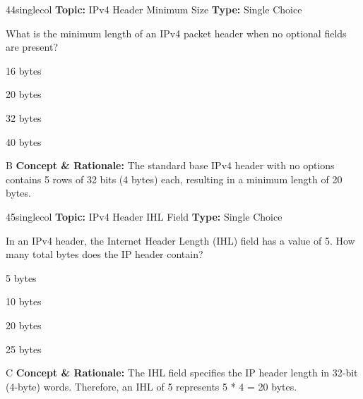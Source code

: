 \begin{qcard}{44}{singlecol}
\textcolor{darkslate!75}{\small\textbf{Topic:} IPv4 Header Minimum Size \hfill \textbf{Type:} Single Choice}\vspace{0.4em}\par
What is the minimum length of an IPv4 packet header when no optional fields are present?
\begin{qoptions}
\item 16 bytes
\item 20 bytes
\item 32 bytes
\item 40 bytes
\end{qoptions}
\end{qcard}
\nopagebreak
\begin{explainbox}{B}
\textbf{Concept \& Rationale:} The standard base IPv4 header with no options contains 5 rows of 32 bits (4 bytes) each, resulting in a minimum length of 20 bytes.
\end{explainbox}

\begin{qcard}{45}{singlecol}
\textcolor{darkslate!75}{\small\textbf{Topic:} IPv4 Header IHL Field \hfill \textbf{Type:} Single Choice}\vspace{0.4em}\par
In an IPv4 header, the Internet Header Length (IHL) field has a value of 5. How many total bytes does the IP header contain?
\begin{qoptions}
\item 5 bytes
\item 10 bytes
\item 20 bytes
\item 25 bytes
\end{qoptions}
\end{qcard}
\nopagebreak
\begin{explainbox}{C}
\textbf{Concept \& Rationale:} The IHL field specifies the IP header length in 32-bit (4-byte) words. Therefore, an IHL of 5 represents 5 * 4 = 20 bytes.
\end{explainbox}

